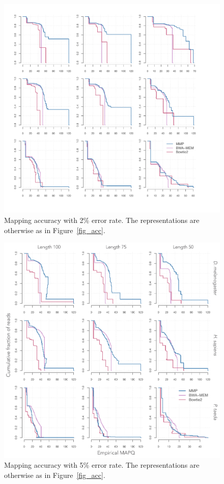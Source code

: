 \documentclass[a4,center,fleqn]{NAR}
\begin{document}
\begin{figure}
\begin{center}
\includegraphics[scale=.54]{accQ2_fig.pdf}
\end{center}
\caption{Mapping accuracy with 2\% error rate. The representations are
otherwise as in Figure~\ref{fig_acc}.}
\end{figure}

\begin{figure}
\begin{center}
\includegraphics[scale=.54]{accQ5_fig.pdf}
\end{center}
\caption{Mapping accuracy with 5\% error rate. The representations are
otherwise as in Figure~\ref{fig_acc}.}
\end{figure}
\end{document}
